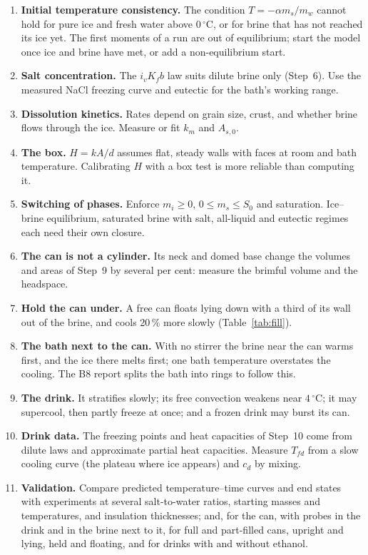 \documentclass[11pt,a4paper]{article}
\newcommand{\dC}{\,{}^{\circ}\mathrm{C}}
\newcommand{\Tfd}{T_{fd}}
\begin{document}
\begin{enumerate}
\item \textbf{Initial temperature consistency.} The condition $T = -\alpha m_s/m_w$ cannot hold for pure ice and
  fresh water above $0\dC$, or for brine that has not reached its ice yet. The first moments of a run are out
  of equilibrium; start the model once ice and brine have met, or add a non-equilibrium start.
\item \textbf{Salt concentration.} The $i_vK_fb$ law suits dilute brine only (Step~6). Use the measured NaCl
  freezing curve and eutectic for the bath's working range.
\item \textbf{Dissolution kinetics.} Rates depend on grain size, crust, and whether brine flows through the
  ice. Measure or fit $k_m$ and $A_{s,0}$.
\item \textbf{The box.} $H = kA/d$ assumes flat, steady walls with faces at room and bath temperature.
  Calibrating $H$ with a box test is more reliable than computing it.
\item \textbf{Switching of phases.} Enforce $m_i \ge 0$, $0 \le m_s \le S_0$ and saturation. Ice--brine
  equilibrium, saturated brine with salt, all-liquid and eutectic regimes each need their own closure.
\item \textbf{The can is not a cylinder.} Its neck and domed base change the volumes and areas of Step~9 by
  several per cent: measure the brimful volume and the headspace.
\item \textbf{Hold the can under.} A free can floats lying down with a third of its wall out of the brine,
  and cools 20\,\% more slowly (Table~\ref{tab:fill}).
\item \textbf{The bath next to the can.} With no stirrer the brine near the can warms first, and the ice there
  melts first; one bath temperature overstates the cooling. The B8 report splits the bath into rings to
  follow this.
\item \textbf{The drink.} It stratifies slowly; its free convection weakens near $4\dC$; it may supercool,
  then partly freeze at once; and a frozen drink may burst its can.
\item \textbf{Drink data.} The freezing points and heat capacities of Step~10 come from dilute laws and
  approximate partial heat capacities. Measure $\Tfd$ from a slow cooling curve (the plateau where ice
  appears) and $c_d$ by mixing.
\item \textbf{Validation.} Compare predicted temperature--time curves and end states with experiments at
  several salt-to-water ratios, starting masses and temperatures, and insulation thicknesses; and, for the
  can, with probes in the drink and in the brine next to it, for full and part-filled cans, upright and
  lying, held and floating, and for drinks with and without ethanol.
\end{enumerate}
\end{document}
